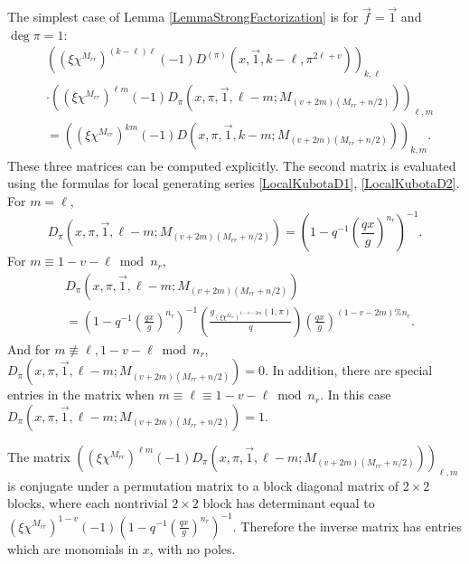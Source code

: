\documentclass[11pt,letterpaper]{article}
\theoremstyle{definition}
\theoremstyle{remark}
\numberwithin{equation}{section}
\theoremstyle{dotless}
\begin{document}
The simplest case of Lemma \ref{LemmaStrongFactorization} is for $\vec{f}=\vec{1}$ and $\deg \pi =1$:
\begin{equation} \label{StrongFactorizationExample}
\begin{split}
&\left( (\xi \chi^{M_{rr}})^{(k-\ell)\ell} (-1)  D^{(\pi)}(x, \vec{1}, k-\ell, \pi^{2\ell+v}) \right)_{k, \ell} \\
&\cdot \left((\xi \chi^{M_{rr}})^{\ell m}(-1) D_\pi(x, \pi, \vec{1}, \ell-m; M_{(v+2m)(M_{rr}+n/2)}) \right)_{\ell,m} \\
&= \left( (\xi \chi^{M_{rr}})^{k m}(-1)D(x, \pi, \vec{1}, k-m; M_{(v+2m)(M_{rr}+n/2)}) \right)_{k,m}.
\end{split}
\end{equation}
These three matrices can be computed explicitly. The second matrix is evaluated using the formulas for local generating series \eqref{LocalKubotaD1}, \eqref{LocalKubotaD2}. For $m=\ell$, 
\begin{equation*} 
D_\pi(x, \pi, \vec{1}, \ell-m; M_{(v+2m)(M_{rr}+n/2)}) = \left( 1- q^{-1}\left(\frac{qx}{g}\right)^{n_r}\right)^{-1}.
\end{equation*}
For $m \equiv 1-v-\ell \bmod n_r$,
\begin{equation*} 
\begin{split}
 &D_\pi(x, \pi, \vec{1}, \ell-m; M_{(v+2m)(M_{rr}+n/2)}) \\
 &= \left( 1- q^{-1}\left(\frac{qx}{g}\right)^{n_r}\right)^{-1} \left(\frac{g_{(\xi \chi^{M_{rr}})^{1-v-2m}}(1, \pi)}{q}\right) \left(\frac{q x}{g}\right)^{(1-v-2m)\%n_r}.
 \end{split}
\end{equation*}
And for $ m \not\equiv \ell, 1-v-\ell \bmod n_r$, $D_\pi(x, \pi, \vec{1}, \ell-m; M_{(v+2m)(M_{rr}+n/2)}) = 0$. In addition, there are special entries in the matrix when $m \equiv \ell \equiv 1-v-\ell \bmod n_r$. In this case $D_\pi(x, \pi, \vec{1}, \ell-m; M_{(v+2m)(M_{rr}+n/2)}) = 1$.

The matrix $\left((\xi \chi^{M_{rr}})^{\ell m}(-1) D_\pi(x, \pi, \vec{1}, \ell-m; M_{(v+2m)(M_{rr}+n/2)}) \right)_{\ell,m}$ is conjugate under a permutation matrix to a block diagonal matrix of $2 \times 2$ blocks, where each nontrivial $2 \times 2$ block has determinant equal to $(\xi \chi^{M_{rr}})^{1-v}(-1)\left( 1- q^{-1}\left(\frac{qx}{g}\right)^{n_r}\right)^{-1}$. Therefore the inverse matrix has entries which are monomials in $x$, with no poles. 
\end{document}

